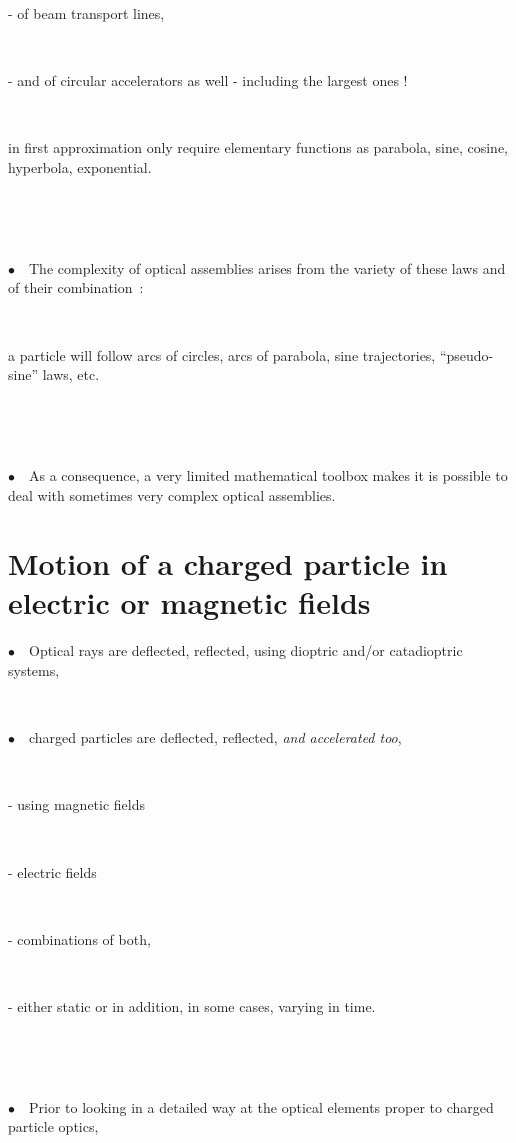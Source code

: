 \documentclass[12pt]{paper}
\newcommand{\nib}{\noindent $\bullet$~}
\newcommand{\nin}{\noindent}
\begin{document}
- of  beam transport lines, 

~

- and of circular accelerators as well -  including the largest ones !  

~

\nin in first approximation only require elementary  functions as parabola,  sine, cosine,  hyperbola, exponential. 

~

~

\nib\ The complexity of optical assemblies arises from the variety of these laws and of their combination~: 

~

a particle will 
follow arcs of circles, arcs of parabola, sine trajectories, ``pseudo-sine'' laws, etc. 

~

~

\nib\ As a consequence, a very limited mathematical toolbox makes it is possible to deal with 
sometimes very complex optical assemblies. 








\clearpage

\section{ \LARGE Motion of a charged particle in electric or magnetic fields}

\bf \Large 

\nib\ Optical rays are deflected, reflected, using dioptric and/or catadioptric systems, 

~

\nib\ charged particles are 
deflected, reflected,  \textsl{and accelerated too}, 

~

- using   magnetic fields 

~

-  electric fields 

~

- combinations of both, 

~

-  either static or in addition, in some cases, varying in time. 

~

~

\nib\ Prior to looking in a detailed way at the optical elements proper to  charged particle optics, 
\end{document}

